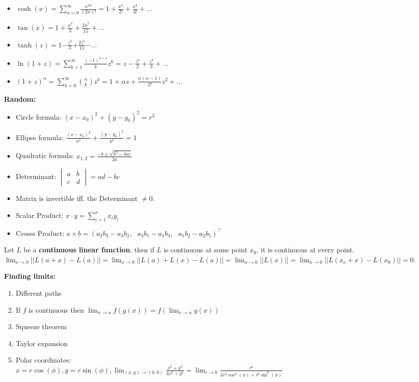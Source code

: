 \documentclass[]{article}
\providecommand{\tightlist}{%
  \setlength{\itemsep}{0pt}\setlength{\parskip}{0pt}}
\newcommand{\hl}[1]{\mathversion{bold}\textbf{\textcolor{red!90!green}{#1}}\mathversion{normal}}
\begin{document}
\begin{multicols*}{3}
\begin{itemize}
  \item $\cosh(x) = \sum_{n=0}^{\infty} \frac{x^{2n}}{(2n)!} = 1 + \frac{x^2}{2!} + \frac{x^4}{4!} + ...$
  \item $\tan(x) = 1 + \frac{\phi^3}{3} + \frac{2\phi^5}{15} + ...$
  \item $\tanh(z) = 1 \pmb{-} \frac{z^3}{3} \pmb{+} \frac{2z^5}{15} \pmb{-} ...$
  \item $\ln(1+z) = \sum_{k=1}^{\infty} \frac{(-1)^{k+1}}{k}z^k = z - \frac{z^2}{2} + \frac{z^3}{3} + ...$
  \item $(1+z)^\alpha = \sum_{k=0}^{\infty}  \binom{\alpha}{k} z^k = 1 + \alpha z + \frac{\alpha(\alpha - 1)}{2!} z ^ 2 + ...$
\end{itemize}

\textbf{Random:}

\begin{itemize}
  \item Circle formula: $(x - x_0)^2 + (y - y_0)^2 = r^2$
  \item Ellipse formula: $\frac{(x-x_0)^2}{a^2} + \frac{(y-y_0)^2}{b^2} = 1$
  \item Quadratic formula: $x_{1, 2} = \frac{-b \pm \sqrt{b^2 - 4ac}}{2a}$
  \item Determinant: $\begin{vmatrix}
    a & b\\
    c & d
  \end{vmatrix} = ad-bc$
  \item Matrix is invertible iff. the Determinant $\neq 0$.
  \item Scalar Product: $x \cdot y = \sum_{i=1}^n x_i y_i$
  \item Crosss Product: $a \times b = (a_2b_3-a_3b_2, ~~~ a_3b_1-a_1b_3, ~~~ a_1b_2-a_2b_1)^\top$
\end{itemize}

Let $L$ be a \hl{continuous linear function}, then if $L$ is continuous at some
point $x_0$, it is continuous at every point.
$\displaystyle \lim_{x\rightarrow 0}||L(a+x)-L(a)|| = \lim_{x \rightarrow 0} ||L(a) + L(x)-L(a)|| = \lim_{x\rightarrow0} ||L(x)|| = \lim_{x \rightarrow0} ||L(x_o+x) -L(x_0)||=0$.

\textbf{Finding limits:}

\begin{enumerate}
\def\labelenumi{\arabic{enumi}.}
\tightlist
\item
  Different paths
\item
  If $f$ is continuous then
  $\displaystyle\lim_{x\rightarrow a}f(g(x)) = f(\lim_{x\rightarrow a}g(x))$
\item
  Squeeze theorem
\item
  Taylor expansion
\item
  Polar coordinates:\\
  $\displaystyle x = r\cos(\phi), y=r\sin(\phi), \lim_{(x,y)\rightarrow (0,0)}\frac{x^2+y^2}{4x^2+y^6}=\lim_{r\rightarrow0}\frac{r^2}{4r^2\cos^4(\phi)+r^6\sin^6(\phi)}$
\end{enumerate}


\end{multicols*}
\end{document}
